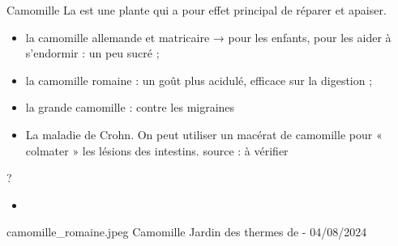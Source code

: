 \ficheidentiteplante
{Camomille}
{%
    La  est une plante qui a pour effet principal de réparer et apaiser.
}
{%
    \begin{itemize}[label = \bcfleurs]
        \item la camomille allemande et matricaire → pour les enfants, pour les aider à s'endormir : un peu sucré ;
        \item la camomille romaine : un goût plus acidulé, efficace sur la digestion ;
        \item la grande camomille : contre les migraines
        \item La maladie de Crohn. On peut utiliser un macérat de camomille pour « colmater » les lésions des intestins. {\tiny source : à vérifier}
    \end{itemize}
}
{%
    ?
}
{%
    \begin{itemize}[label = \bcplume]
        \item 
    \end{itemize}
}
{%
    \begin{Remarque}
        
    \end{Remarque}
}
{%
    camomille_romaine.jpeg
}
{%
    Camomille
}
{%
    Jardin des thermes de  - 04/08/2024
}